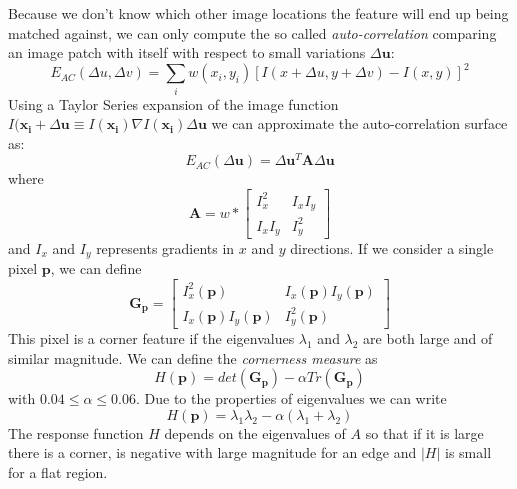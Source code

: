 \documentclass[a4paper,twocolumn]{article}
\begin{document}
Because we don't know which other image locations the feature will end up being
matched against, we can only compute the so called \textit{auto-correlation}
comparing an image patch with itself with respect to small variations $\Delta\mathbf{u}$:
\begin{equation}
	E_{AC}(\Delta u, \Delta v) = \sum_i w(x_i,y_i) [I(x+\Delta u, y+\Delta v) - I(x,y)]^2
\end{equation}
Using a Taylor Series expansion of the image function $I(\mathbf{x_i}+\Delta
\mathbf{u} \equiv I(\mathbf{x_i}) \nabla I(\mathbf{x_i})\Delta \mathbf{u}$ we
can approximate the auto-correlation surface as:
\begin{equation}
	E_{AC}(\Delta \mathbf{u})=\Delta \mathbf{u}^T \mathbf{A} \Delta \mathbf{u}
\end{equation}
where
\begin{equation}
	\mathbf{A} = w * \begin{bmatrix}
		I_x^2 & I_x I_y \\
		I_x I_y & I_y^2
	\end{bmatrix}
\end{equation}
and $I_x$ and $I_y$ represents gradients in $x$ and $y$ directions. If we
consider a single pixel $\mathbf{p}$, we can define
\begin{equation}
	\mathbf{G_p} = \begin{bmatrix}
		I_x^2(\mathbf{p}) & I_x(\mathbf{p}) I_y(\mathbf{p}) \\
		I_x(\mathbf{p}) I_y(\mathbf{p}) & I_y^2(\mathbf{p})
	\end{bmatrix}
\end{equation}
This pixel is a corner feature if the eigenvalues $\lambda_1$ and $\lambda_2$
are both large and of similar magnitude. We can define the \textit{cornerness
measure} as
\begin{equation}
	H(\mathbf{p}) = det(\mathbf{G_p}) - \alpha Tr(\mathbf{G_p})
\end{equation}
with $0.04 \le \alpha \le 0.06$. Due to the properties of eigenvalues we can
write
\begin{equation}
	H(\mathbf{p}) = \lambda_1 \lambda_2 - \alpha (\lambda_1 + \lambda_2)
\end{equation}
The response function $H$ depends on the eigenvalues of $A$ so that if it is
large there is a corner, is negative with large magnitude for an edge and
$|H|$ is small for a flat region.
\end{document}
